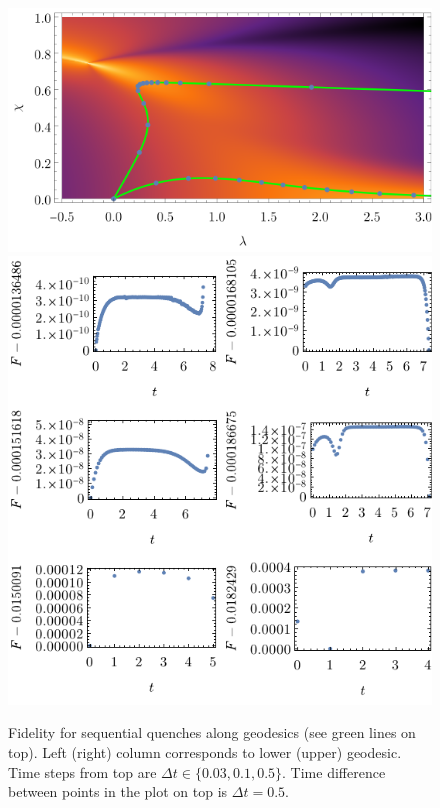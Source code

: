 
\begin{figure}[h]
    \centering
    \includegraphics[scale=1.2]{../img/bg123.pdf}
    \includegraphics[scale=1.2]{../img/plotsFidelityQuenches.pdf}
    \caption{Fidelity for sequential quenches along geodesics (see green lines on top). Left (right) column corresponds to lower (upper) geodesic. Time steps from top are $\Delta t\in \{0.03,0.1,0.5\}$. Time difference between points in the plot on top is $\Delta t=0.5$.}
    \label{fig:plotsFidelityQuenches}    
\end{figure}


